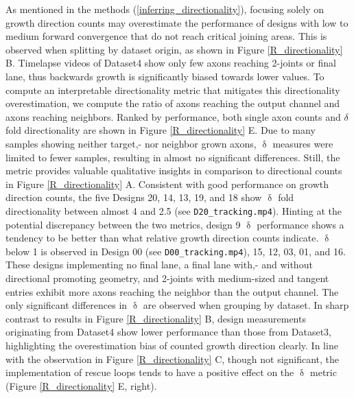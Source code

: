 As mentioned in the methods (\ref{inferring_directionality}), focusing solely on
growth direction counts may overestimate the performance of designs with low to
medium forward convergence that do not reach critical joining areas. This is
observed when splitting by dataset origin, as shown in Figure
\ref{R_directionality} B. Timelapse videos of Dataset4 show only few axons
reaching 2-joints or final lane, thus backwards growth is significantly biased
towards lower values. To compute an interpretable directionality metric that
mitigates this directionality overestimation, we compute the ratio of axons
reaching the output channel and axons reaching neighbors. Ranked by performance,
both single axon counts and $\delta$ fold directionality are shown in Figure
\ref{R_directionality} E. Due to many samples showing neither target,- nor
neighbor grown axons, $\updelta$ measures were limited to fewer samples,
resulting in almost no significant differences. Still, the metric provides
valuable qualitative insights in comparison to directional counts in Figure
\ref{R_directionality} A. Consistent with good performance on growth direction
counts, the five Designs 20, 14, 13, 19, and 18 show $\updelta$ fold
directionality between almost 4 and 2.5 (see \verb|D20_tracking.mp4|). Hinting
at the potential discrepancy between the two metrics, design 9 $\updelta$
performance shows a tendency to be better than what relative growth direction
counts indicate. $\updelta$ below 1 is observed in Design 00 (see
\verb|D00_tracking.mp4|), 15, 12, 03, 01, and 16. These designs implementing no
final lane, a final lane with,- and without directional promoting geometry, and
2-joints with medium-sized and tangent entries exhibit more axons reaching the
neighbor than the output channel. The only significant differences in $\updelta$
are observed when grouping by dataset. In sharp contrast to results in Figure
\ref{R_directionality} B, design measurements originating from Dataset4 show
lower performance than those from Dataset3, highlighting the overestimation bias
of counted growth direction clearly. In line with the observation in Figure
\ref{R_directionality} C, though not significant, the implementation of rescue
loops tends to have a positive effect on the $\updelta$ metric (Figure
\ref{R_directionality} E, right).

